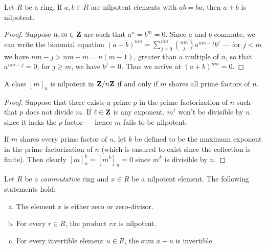 %
\begin{lemma}
\label{lem:nilpotent-sum}
Let \(R\) be a ring. If \(a, b \in R\) are nilpotent elements with \(a b = b
a\), then \(a + b\) is nilpotent.
\end{lemma}
%

%
\begin{proof}
Suppose \(n, m \in \mathbf{Z}\) are such that \(a^n = b^m = 0\). Since \(a\) and \(b\)
commute, we can write the binomial equation
\((a + b)^{n m} = \sum_{j=0}^{n m} \binom{nm}{j} a^{n m - j} b^j\) --- for
\(j < m\) we have \(n m - j > nm - m = n (m - 1)\), greater than a
multiple of \(n\), so that \(a^{n m - j} = 0\); for \(j \geq m\), we have
\(b^j = 0\). Thus we arrive at \((a + b)^{n m} = 0\).
\end{proof}
%

%
\begin{lemma}
\label{lem:nilpotent-in-Z/nZ}
A class \([m]_n\) is nilpotent in \(\mathbf{Z}/n\mathbf{Z}\) if and only if \(m\) shares all
prime factors of \(n\).
\end{lemma}
%

%
\begin{proof}
Suppose that there exists a prime \(p\) in the prime factorization of \(n\) such
that \(p\) does not divide \(m\). If \(\ell \in \mathbf{Z}\) is any exponent,
\(m^{\ell}\) won't be divisible by \(n\) since it lacks the \(p\) factor ---
hence \(m\) fails to be nilpotent.

If \(m\) shares every prime factor of \(n\), let \(k\) be defined to be the
maximum exponent in the prime factorization of \(n\) (which is ensured to exist
since the collection is finite). Then clearly \([m]_n^k = [m^k]_n = 0\) since
\(m^k\) is divisible by \(n\).
\end{proof}
%

%
\begin{lemma}
\label{lem:properties-nilpotent-element-in-commutative-ring}
Let \(R\) be a \emph{commutative} ring and \(x \in R\) be a nilpotent
element. The following statements hold:
\begin{enumerate}[(a)]\setlength\itemsep{0em}
\item The element \(x\) is either zero or zero-divisor.

\item For every \(r \in R\), the product \(r x\) is nilpotent.

\item For every invertible element \(u \in R\), the sum \(x + u\) is invertible.
\end{enumerate}
\end{lemma}
%

